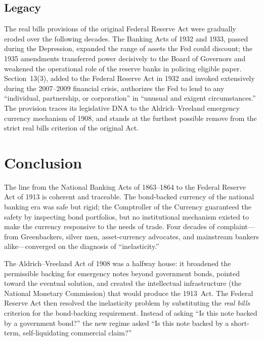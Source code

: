 \documentclass[12pt]{article}
\begin{document}
\subsection{Legacy}

The real bills provisions of the original Federal Reserve Act were gradually
eroded over the following decades.  The Banking Acts of 1932 and 1933, passed
during the Depression, expanded the range of assets the Fed could discount; the 1935
amendments transferred power decisively to the Board of Governors and weakened the
operational role of the reserve banks in policing eligible paper.  Section~13(3),
added to the Federal Reserve Act in 1932 and invoked extensively during the
2007--2009 financial crisis, authorizes the Fed to lend to any ``individual,
partnership, or corporation'' in ``unusual and exigent circumstances.''
The provision traces its legislative DNA to the Aldrich--Vreeland emergency
currency mechanism of 1908, and stands at the furthest possible remove from the
strict real bills criterion of the original Act.

\section{Conclusion}
\label{sec:conclusion}

The line from the National Banking Acts of 1863--1864 to the Federal Reserve Act
of 1913 is coherent and traceable.  The bond-backed currency of the national
banking era was safe but rigid; the Comptroller of the Currency guaranteed the safety
by inspecting bond portfolios, but no institutional mechanism existed to make
the currency responsive to the needs of trade.  Four decades of complaint---from
Greenbackers, silver men, asset-currency advocates, and mainstream bankers
alike---converged on the diagnosis of ``inelasticity.''

The Aldrich--Vreeland Act of 1908 was a halfway house: it broadened the
permissible backing for emergency notes beyond government bonds, pointed toward the
eventual solution, and created the intellectual infrastructure (the National Monetary
Commission) that would produce the 1913~Act.  The Federal Reserve Act then
resolved the inelasticity problem by substituting the \emph{real bills} criterion for
the bond-backing requirement.  Instead of asking ``Is this note backed by a government
bond?'' the new regime asked ``Is this note backed by a short-term, self-liquidating
commercial claim?''
\end{document}
